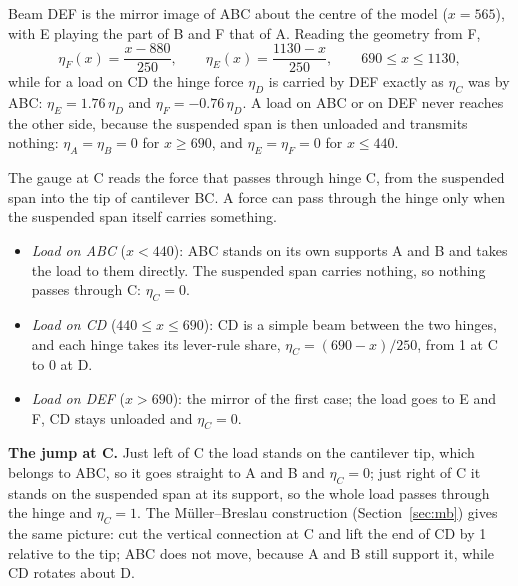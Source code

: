 \documentclass[11pt,a4paper]{article}
\newcommand{\il}[1]{\eta_{#1}}
\begin{document}
\begin{stepbox}
Beam DEF is the mirror image of ABC about the centre of the model ($x = 565$), with E playing the part of B and F that of A. Reading the geometry from F,
\begin{equation}
  \il{F}(x) = \frac{x - 880}{250}, \qquad \il{E}(x) = \frac{1130 - x}{250}, \qquad 690 \le x \le 1130,
  \label{eq:etaEF}
\end{equation}
while for a load on CD the hinge force $\il{D}$ is carried by DEF exactly as $\il{C}$ was by ABC: $\il{E} = 1.76\,\il{D}$ and $\il{F} = -0.76\,\il{D}$. A load on ABC or on DEF never reaches the other side, because the suspended span is then unloaded and transmits nothing: $\il{A} = \il{B} = 0$ for $x \ge 690$, and $\il{E} = \il{F} = 0$ for $x \le 440$.
\end{stepbox}

\begin{stepbox}[Why $\il{C}$ and $\il{D}$ are non-zero only between C and D]
The gauge at C reads the force that passes through hinge C, from the suspended span into the tip of cantilever BC. A force can pass through the hinge only when the suspended span itself carries something.
\begin{itemize}[leftmargin=*,itemsep=2pt]
\item \emph{Load on ABC} ($x < 440$): ABC stands on its own supports A and B and takes the load to them directly. The suspended span carries nothing, so nothing passes through C: $\il{C} = 0$.
\item \emph{Load on CD} ($440 \le x \le 690$): CD is a simple beam between the two hinges, and each hinge takes its lever-rule share, $\il{C} = (690-x)/250$, from 1 at C to 0 at D.
\item \emph{Load on DEF} ($x > 690$): the mirror of the first case; the load goes to E and F, CD stays unloaded and $\il{C} = 0$.
\end{itemize}
\textbf{The jump at C.} Just left of C the load stands on the cantilever tip, which belongs to ABC, so it goes straight to A and B and $\il{C} = 0$; just right of C it stands on the suspended span at its support, so the whole load passes through the hinge and $\il{C} = 1$. The Müller--Breslau construction (Section~\ref{sec:mb}) gives the same picture: cut the vertical connection at C and lift the end of CD by 1 relative to the tip; ABC does not move, because A and B still support it, while CD rotates about D.
\end{stepbox}
\end{document}
